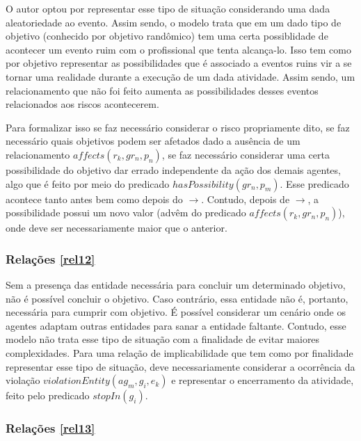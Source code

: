 \documentclass[12pt]{article}
\begin{document}
O autor optou por representar esse tipo de situação considerando uma dada aleatoriedade ao evento. Assim sendo, o modelo trata que em um dado tipo de objetivo (conhecido por objetivo randômico) tem uma certa possiblidade de acontecer um evento ruim com o profissional que tenta alcança-lo. Isso tem como por objetivo representar as possibilidades que é associado a eventos ruins vir a se tornar uma realidade durante a execução de um dada atividade. Assim sendo, um relacionamento que não foi feito aumenta as possibilidades desses eventos relacionados aos riscos acontecerem. 

Para formalizar isso se faz necessário considerar o risco propriamente dito, se faz necessário quais objetivos podem ser afetados dado a ausência de um relacionamento $affects(r_k,gr_n,p_n)$, se faz necessário considerar uma certa possibilidade do objetivo dar errado independente da ação dos demais agentes, algo que é feito por meio do predicado  $hasPossibility(gr_n,p_m)$. Esse predicado acontece tanto antes bem como depois do $\to$. Contudo, depois de $\to$, a possibilidade possui um novo valor (advêm do predicado $affects(r_k,gr_n,p_n)$), onde deve ser necessariamente maior que o anterior.

\subsubsection{Relações \ref{rel12}}

Sem a presença das entidade necessária para concluir um determinado objetivo, não é possível concluir o objetivo. Caso contrário, essa entidade não é, portanto, necessária para cumprir com objetivo. É possível considerar um cenário onde os agentes adaptam outras entidades para sanar a entidade faltante. Contudo, esse modelo não trata esse tipo de situação com a finalidade de evitar maiores complexidades. Para uma relação de implicabilidade que tem como por finalidade representar esse tipo de situação, deve necessariamente considerar a ocorrência da violação $violationEntity(ag_m,g_i,e_k)$ e representar o encerramento da atividade, feito pelo predicado $stopIn(g_i)$.

\subsubsection{Relações \ref{rel13}}
\end{document}
